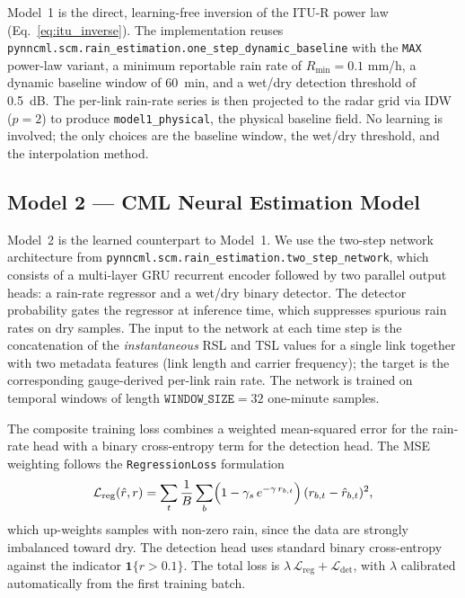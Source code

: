\documentclass[12pt, a4paper]{article}
\begin{document}
Model~1 is the direct, learning-free inversion of the ITU-R power law
(Eq.~\ref{eq:itu_inverse}). The implementation reuses
\texttt{pynncml.scm.rain\_estimation.one\_step\_dynamic\_baseline} with
the \texttt{MAX} power-law variant, a minimum reportable rain rate of
\(R_{\min} = 0.1\) mm/h, a dynamic baseline window of 60~min, and a
wet/dry detection threshold of 0.5~dB. The per-link rain-rate series
is then projected to the radar grid via IDW
(\(p=2\)) to produce \texttt{model1\_physical}, the physical baseline
field. No learning is involved; the only choices are the baseline
window, the wet/dry threshold, and the interpolation method.

\subsection{Model 2 --- CML Neural Estimation Model}\label{sec:model2}

Model~2 is the learned counterpart to Model~1. We use the two-step
network architecture from \texttt{pynncml.scm.rain\_estimation.two\_step\_network},
which consists of a multi-layer GRU recurrent encoder followed by two
parallel output heads: a rain-rate regressor and a wet/dry binary
detector. The detector probability gates the regressor at inference
time, which suppresses spurious rain rates on dry samples. The input
to the network at each time step is the concatenation of the
\emph{instantaneous} RSL and TSL values for a single link together
with two metadata features (link length and carrier frequency); the
target is the corresponding gauge-derived per-link rain rate. The
network is trained on temporal windows of length
\(\texttt{WINDOW\_SIZE} = 32\) one-minute samples.

The composite training loss combines a weighted mean-squared error for
the rain-rate head with a binary cross-entropy term for the detection
head. The MSE weighting follows the
\texttt{RegressionLoss} formulation
\begin{equation}
  \mathcal{L}_{\text{reg}}(\hat{r}, r) =
  \sum_{t}\frac{1}{B}\sum_{b}\Bigl(1 - \gamma_s\,e^{-\gamma\,r_{b,t}}\Bigr)\,
                (r_{b,t} - \hat{r}_{b,t})^2, \label{eq:reg_loss}
\end{equation}
which up-weights samples with non-zero rain, since the data are
strongly imbalanced toward dry. The detection head uses standard
binary cross-entropy against the indicator \(\mathbf{1}\{r > 0.1\}\).
The total loss is
\(\lambda\,\mathcal{L}_{\text{reg}} + \mathcal{L}_{\text{det}}\), with
\(\lambda\) calibrated automatically from the first training batch.
\end{document}
